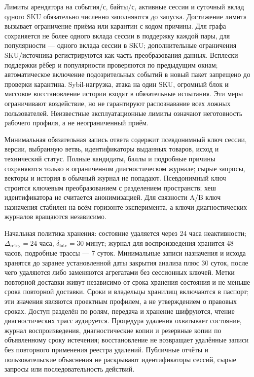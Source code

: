 \documentclass[12pt,a4paper]{article}
\theoremstyle{plainru}
\begin{document}
Лимиты арендатора на события/с, байты/с, активные сессии и суточный вклад
одного SKU обязательно численно заполняются до запуска. Достижение
лимита вызывает ограничение приёма или карантин с кодом причины.
Для графа сохраняется не более одного вклада сессии в поддержку
каждой пары, для популярности --- одного вклада сессии в SKU;
дополнительные ограничения SKU/источника регистрируются как часть
преобразования данных. Всплески поддержки рёбер и популярности проверяются по
предыдущим окнам; автоматическое включение подозрительных событий
в новый пакет запрещено до проверки карантина. Sybil-нагрузка,
атака на один SKU, огромный блок и массовое восстановление истории входят в обязательные
испытания. Эти меры ограничивают воздействие, но не гарантируют
распознавание всех ложных пользователей. Неизвестные эксплуатационные
лимиты означают неготовность рабочего профиля, а не неограниченный приём.

Минимальная обязательная запись ответа содержит псевдонимный ключ
сессии, версии, выбранную ветвь, идентификаторы выданных товаров,
исход и технический статус. Полные кандидаты, баллы и подробные
причины сохраняются только в ограниченном диагностическом журнале;
сырые запросы, векторы и история в обычный журнал не попадают.
Псевдонимный ключ строится ключевым преобразованием с разделением
пространств; хеш идентификатора не считается анонимизацией.
Для связности A/B ключ назначения стабилен на всём горизонте
эксперимента, а ключи диагностических журналов вращаются независимо.

Начальная политика хранения: состояние удаляется через 24 часа
неактивности; $\Delta_{\mathrm{retry}}=24$ часа,
$\delta_{\mathrm{late}}=30$ минут; журнал для воспроизведения хранится 48 часов,
подробные трассы --- 7 суток. Минимальные записи назначения и исхода
хранятся до заранее установленной даты закрытия анализа плюс 30 суток,
после чего удаляются либо заменяются агрегатами без сессионных ключей.
Метки повторной доставки живут независимо от срока хранения состояния и не меньше
срока повторной доставки. Сроки и владельцы хранилищ включаются
в паспорт; эти значения являются проектным профилем, а не
утверждением о правовых сроках. Доступ разделён по ролям,
передача и хранение шифруются, чтение диагностических трасс аудируется.
Процедура удаления охватывает состояние, журнал воспроизведения, диагностические копии
и резервные копии по объявленному сроку истечения; восстановление
не возвращает удалённые записи без повторного применения реестра удалений.
Публичные отчёты и пользовательские объяснения не раскрывают
идентификаторы сессий, сырые запросы или последовательность действий.
\end{document}
